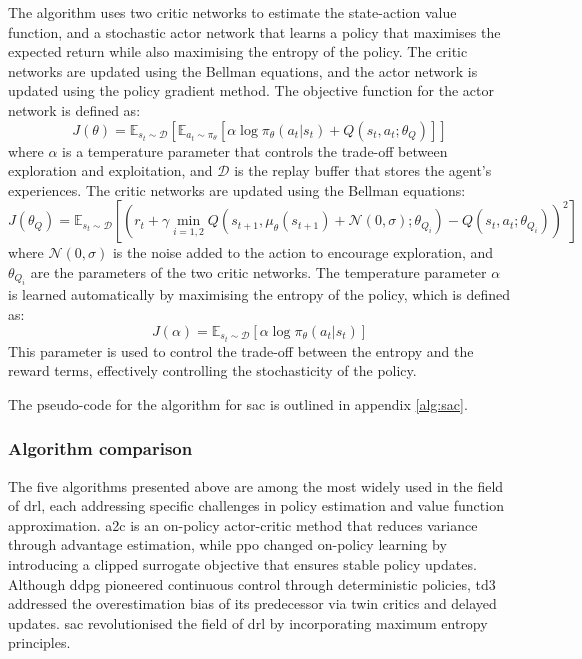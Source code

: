 The algorithm uses two critic networks to estimate the state-action value function, and a stochastic actor network that learns a policy that maximises the expected return while also maximising the entropy of the policy. The critic networks are updated using the Bellman equations, and the actor network is updated using the policy gradient method. The objective function for the actor network is defined as:
\begin{equation}
    J(\theta) = \mathbb{E}_{s_t \sim \mathcal{D}} \left[\mathbb{E}_{a_t \sim \pi_\theta} \left[\alpha \log \pi_\theta(a_t | s_t) + Q(s_t, a_t; \theta_Q)\right]\right]
\end{equation}
where $\alpha$ is a temperature parameter that controls the trade-off between exploration and exploitation, and $\mathcal{D}$ is the replay buffer that stores the agent's experiences. The critic networks are updated using the Bellman equations:
\begin{equation}
    J(\theta_Q) = \mathbb{E}_{s_t \sim \mathcal{D}} \left[\left(r_t + \gamma \min_{i=1,2} Q(s_{t+1}, \mu_\theta(s_{t+1}) + \mathcal{N}(0, \sigma); \theta_{Q_i}) - Q(s_t, a_t; \theta_{Q_i})\right)^2\right]
\end{equation}
where $\mathcal{N}(0, \sigma)$ is the noise added to the action to encourage exploration, and $\theta_{Q_i}$ are the parameters of the two critic networks. The temperature parameter $\alpha$ is learned automatically by maximising the entropy of the policy, which is defined as:
\begin{equation}
    J(\alpha) = \mathbb{E}_{s_t \sim \mathcal{D}} \left[\alpha \log \pi_\theta(a_t | s_t)\right]
\end{equation}
This parameter is used to control the trade-off between the entropy and the reward terms, effectively controlling the stochasticity of the policy.

The pseudo-code for the algorithm for \acrshort{sac} is outlined in appendix \ref{alg:sac}.

\subsubsection{Algorithm comparison} \label{sec:algorithmcomparison}

The five algorithms presented above are among the most widely used in the field of \acrshort{drl}, each addressing specific challenges in policy estimation and value function approximation. \acrshort{a2c} is an on-policy actor-critic method that reduces variance through advantage estimation, while \acrshort{ppo} changed on-policy learning by introducing a clipped surrogate objective that ensures stable policy updates. Although \acrshort{ddpg} pioneered continuous control through deterministic policies, \acrshort{td3} addressed the overestimation bias of its predecessor via twin critics and delayed updates. \acrshort{sac} revolutionised the field of \acrshort{drl} by incorporating maximum entropy principles.

